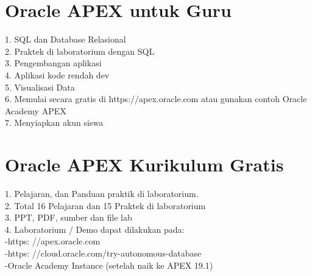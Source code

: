 \documentclass [12pt, times new roman, a4paper]{article}
\begin{document}
\section{Oracle APEX untuk Guru}
1. SQL dan Database Relasional\\
2. Praktek di laboratorium dengan SQL\\
3. Pengembangan aplikasi\\
4. Aplikasi kode rendah dev\\
5. Visualisasi Data\\
6. Memulai secara gratis di https://apex.oracle.com atau gunakan contoh Oracle Academy APEX\\
7. Menyiapkan akun siswa\\
\section{Oracle APEX Kurikulum Gratis}
1. Pelajaran, dan Panduan praktik di laboratorium.\\
2. Total 16 Pelajaran dan 15 Praktek di laboratorium\\
3. PPT, PDF, sumber dan file lab\\
4. Laboratorium / Demo dapat dilakukan pada:\\
-https: //apex.oracle.com\\
-https: //cloud.oracle.com/try-autonomous-database\\
-Oracle Academy Instance (setelah naik ke APEX 19.1)
\end{document}
